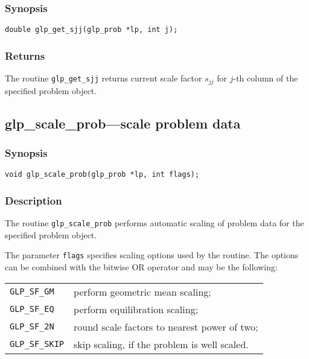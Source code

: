 \subsubsection*{Synopsis}

\begin{verbatim}
double glp_get_sjj(glp_prob *lp, int j);
\end{verbatim}

\subsubsection*{Returns}

The routine \verb|glp_get_sjj| returns current scale factor $s_{jj}$ for
$j$-th column of the specified problem object.

\subsection{glp\_scale\_prob---scale problem data}

\subsubsection*{Synopsis}

\begin{verbatim}
void glp_scale_prob(glp_prob *lp, int flags);
\end{verbatim}

\subsubsection*{Description}

The routine \verb|glp_scale_prob| performs automatic scaling of problem
data for the specified problem object.

The parameter \verb|flags| specifies scaling options used by the
routine. The options can be combined with the bitwise OR operator and
may be the following:

\begin{tabular}{@{}ll}
\verb|GLP_SF_GM| & perform geometric mean scaling;\\
\verb|GLP_SF_EQ| & perform equilibration scaling;\\
\verb|GLP_SF_2N| & round scale factors to nearest power of two;\\
\verb|GLP_SF_SKIP| & skip scaling, if the problem is well scaled.\\
\end{tabular}

